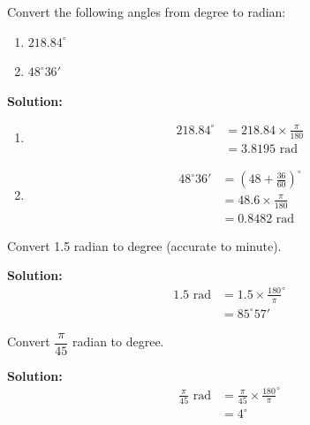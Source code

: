 \documentclass{report}
\newcommand{\sol}{\noindent\textbf{Solution:} }
\begin{document}
\begin{question}
    Convert the following angles from degree to radian:
    \vspace{-1em}
    \begin{multicols}{2}
        \begin{enumerate}[label=(\alph*)]
            \item $218.84^\circ$
            \item $48^\circ 36'$
        \end{enumerate}
    \end{multicols}
    \vspace{-1em}
    \sol{}
    \begin{enumerate}[label=(\alph*)]
        \item \begin{align*}
            218.84^\circ &= 218.84 \times \frac{\pi}{180}\\
            &= 3.8195 \text{ rad}
        \end{align*}
        \item \begin{align*}
            48^\circ 36' &= \left(48 + \frac{36}{60}\right)^{\circ}\\
            & = 48.6 \times \frac{\pi}{180}\\
            & = 0.8482 \text{ rad}
        \end{align*}
    \end{enumerate}
\end{question}

\begin{question}
    Convert 1.5 radian to degree (accurate to minute).

    \sol{}
    \begin{align*}
        1.5 \text{ rad} &= 1.5 \times \frac{180}{\pi}^\circ\\
        &= 85^\circ 57'
    \end{align*}
\end{question}

\begin{question}
    Convert $\dfrac{\pi}{45}$ radian to degree.

    \sol{}
    \begin{align*}
        \frac{\pi}{45} \text{ rad} &= \frac{\pi}{45} \times \frac{180}{\pi}^\circ\\
        &= 4^\circ
    \end{align*}
\end{question}
\end{document}
